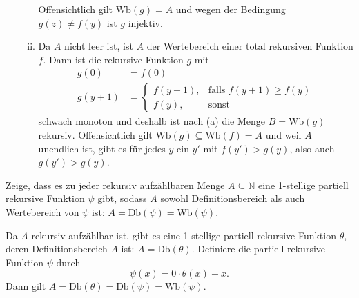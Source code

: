 \documentclass[german,headsepline]{scrartcl}
\begin{document}
\begin{solution}
\begin{enumerate}[(a)]
\begin{enumerate}[(i)]
						Offensichtlich gilt $\text{Wb}(g)=A$ und wegen der Bedingung $g(z)\neq f(y)$ ist $g$ injektiv.
					\item Da $A$ nicht leer ist, ist $A$ der Wertebereich einer total rekursiven Funktion $f$.
						Dann ist die rekursive Funktion $g$ mit
						\begin{align*}
							g(0) &= f(0) \\
							g(y+1) &= \begin{cases}
								f(y+1), &\text{falls }f(y+1)\geq f(y) \\
								f(y), &\text{sonst}
							\end{cases}
						\end{align*}
						schwach monoton und deshalb ist nach (a) die Menge $B=\text{Wb}(g)$ rekursiv.
						Offensichtlich gilt $\text{Wb}(g)\subseteq \text{Wb}(f)=A$ und weil $A$ unendlich ist,
						gibt es für jedes $y$ ein $y'$ mit $f(y')>g(y)$, also auch $g(y')>g(y)$.
				\end{enumerate}
		\end{enumerate}
	\end{solution}
	
	\begin{question}[subtitle={Klausur 2009}]
		Zeige, dass es zu jeder rekursiv aufzählbaren Menge $A\subseteq\mathbb{N}$ eine 1-stellige partiell rekursive Funktion $\psi$ gibt,
		sodass $A$ sowohl Definitionsbereich als auch Wertebereich von $\psi$ ist: $A=\text{Db}(\psi)=\text{Wb}(\psi)$.
	\end{question}
	\begin{solution}
		Da $A$ rekursiv aufzählbar ist, gibt es eine 1-stellige partiell rekursive Funktion $\theta$,
		deren Definitionsbereich $A$ ist: $A=\text{Db}(\theta)$.
		Definiere die partiell rekursive Funktion $\psi$ durch
		\[\psi(x)=0\cdot\theta(x)+x.\]
		Dann gilt $A=\text{Db}(\theta)=\text{Db}(\psi)=\text{Wb}(\psi)$.
	\end{solution}
	
\end{document}
